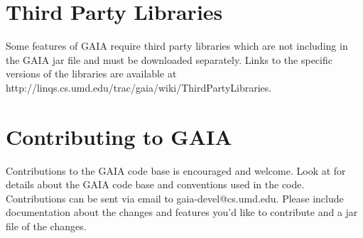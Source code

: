 \section{Third Party Libraries}
\label{thirdparty}
Some features of GAIA require third party libraries which are not
including in the GAIA jar file and must be downloaded separately.
Links to the specific versions of the libraries are available at
http://linqs.cs.umd.edu/trac/gaia/wiki/ThirdPartyLibraries.

\section{Contributing to GAIA}
\label{contributing}
Contributions to the GAIA code base is encouraged and welcome.
Look at  for details about the GAIA code base
and conventions used in the code.  Contributions can be sent
via email to gaia-devel@cs.umd.edu.  Please include documentation
about the changes and features you'd like to contribute and
a jar file of the changes.

